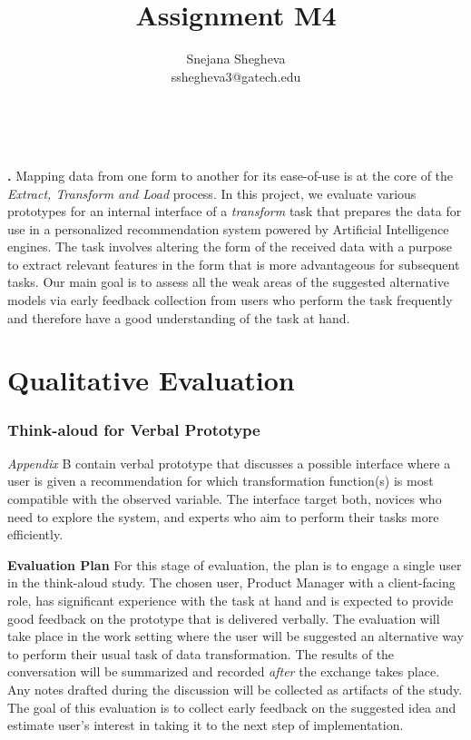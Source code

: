 \documentclass[12pt,letterpaper]{article}
\makeatletter
\renewcommand{\maketitle}{\bgroup
   \begin{center}
   \textbf{{\fontsize{18pt}{20}\selectfont \@title}}\\
   \vspace{10pt}
   {\fontsize{12pt}{0}\selectfont \@author} 
   \end{center}
}
\newenvironment{myquote}[1]%
  {\list{}{\leftmargin=#1\rightmargin=#1}\item[]}%
  {\endlist}
\renewenvironment{abstract}
{\vspace*{-.5in}\fontsize{12pt}{12}\begin{myquote}{.5in}
\noindent \par{\bfseries \abstractname.}}
{\medskip\noindent
\end{myquote}
}
\makeatother
\begin{document}
\title{Assignment M4}
\author{Snejana Shegheva \\ sshegheva3@gatech.edu}

\maketitle
\thispagestyle{fancy}

\begin{abstract}
Mapping data from one form to another for its ease-of-use is at the core of the \textit{Extract, Transform and Load} process. In this project, we evaluate various prototypes for an internal interface of a \textit{transform} task that prepares the data for use in a personalized recommendation system powered by Artificial Intelligence engines. The task involves altering the form of the received data with a purpose to extract relevant features in the form that is more advantageous for subsequent tasks. Our main goal is to assess all the weak areas of the suggested alternative models via early feedback collection from users who perform the task frequently and therefore have a good understanding of the task at hand.  
\end{abstract}

\section*{Qualitative Evaluation}
\subsubsection*{Think-aloud for Verbal Prototype}
\textit{Appendix} B contain verbal prototype that discusses a possible interface where a user is given a recommendation for which transformation function(s) is most compatible with the observed variable. The interface target both, novices who need to explore the system, and experts who aim to perform their tasks more efficiently.

\textbf{Evaluation Plan}
For this stage of evaluation, the plan is to engage a single user in the think-aloud study. The chosen user, Product Manager with a client-facing role, has significant experience with the task at hand and is expected to provide good feedback on the prototype that is delivered verbally. The evaluation will take place in the work setting where the user will be suggested an alternative way to perform their usual task of data transformation. The results of the conversation will be summarized and recorded \textit{after} the exchange takes place. Any notes drafted during the discussion will be collected as artifacts of the study. The goal of this evaluation is to collect early feedback on the suggested idea and estimate user's interest in taking it to the next step of implementation.
\end{document}
